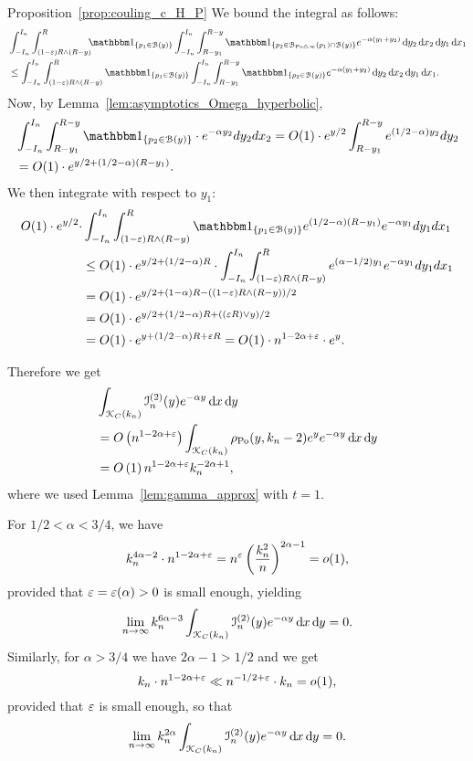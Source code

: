 \begin{proofof}{Proposition~\ref{prop:couling_c_H_P}}
We bound the integral as follows: 
\begin{align*}
	&\int_{-I_n}^{I_n} \int_{(1-\eps) R \wedge (R-y)}^{R} \hspace{-5pt} \ind{p_1 \in \BallHyp{y}}
		\int_{-I_n}^{I_n} \int_{R - y_1}^{R - y} \ind{p_2 \in \BallSym{p_1} \cap \BallHyp{y}}
		e^{-\alpha(y_1 + y_2)} \dd y_2 \dd x_2 \dd y_1 \dd x_1 \\
	&\leq \int_{-I_n}^{I_n} \int_{(1-\eps) R \wedge (R-y)}^{R} \ind{p_1 \in \BallHyp{y}}
		\int_{-I_n}^{I_n} \int_{R - y_1}^{R - y} 
		\ind{p_2 \in  \BallHyp{y}} e^{-\alpha(y_1 + y_2)} \dd y_2 \dd x_2 \dd y_1 \dd x_1.
\end{align*}
Now, by Lemma~\ref{lem:asymptotics_Omega_hyperbolic},
\begin{align*}
&\int_{-I_n}^{I_n} \int_{R - y_1}^{R - y} \ind{p_2 \in  \BallHyp{y}} \cdot  
e^{-\alpha y_2} dy_2 dx_2 = O(1) \cdot e^{y/2} \int_{R - y_1}^{R - y} e^{(1/2 - \alpha) y_2} dy_2 \\
&= O(1) \cdot e^{y/2 + (1/2 - \alpha) (R - y_1)}.
\end{align*}
We then integrate with respect to $y_1$:
\begin{align*}
	O(1) \cdot e^{y/2} \cdot 
	&\int_{-I_n}^{I_n} \int_{(1-\eps) R \wedge (R-y)}^{R} \ind{p_1 \in \BallHyp{y}} 
		e^{(1/2 - \alpha) (R - y_1)} e^{-\alpha y_1} dy_1 dx_1 \\
	&\le O(1) \cdot e^{y/2 + (1/2 -\alpha) R} \cdot \int_{-I_n}^{I_n} \int_{(1-\eps) R \wedge (R-y)}^{R} 
		e^{(\alpha -1/2) y_1} e^{-\alpha y_1} dy_1dx_1 \\
	&=O(1) \cdot e^{y/2 + (1 -\alpha) R -((1-\eps) R \wedge (R-y))/2} \\
	&=O(1) \cdot e^{y/2 + (1/2 -\alpha) R + ((\eps R) \vee y)/2}\\
	&=O(1) \cdot e^{y + (1/2 -\alpha) R + \eps R}
		= O(1) \cdot n^{1- 2\alpha+ \eps} \cdot e^{y}. 
\end{align*}

Therefore we get
\begin{align*} 
	&\int_{{\mathcal K}_{C}(k_n)}\mathcal{I}_n^{(2)}(y) e^{-\alpha y} \operatorname{\mathrm{d}\hspace{-2pt}} x \operatorname{\mathrm{d}\hspace{-2pt}} y\\
	&= O\left( n^{1-2\alpha + \varepsilon} \right)
		\int_{{\mathcal K}_{C}(k_n)} \rho_{{\mathrm{Po}}}(y,k_n-2) e^{y} e^{-\alpha y} \operatorname{\mathrm{d}\hspace{-2pt}} x \operatorname{\mathrm{d}\hspace{-2pt}} y\\
	&= O\left(1\right) n^{1-2\alpha + \varepsilon} k_n^{-2\alpha + 1},
\end{align*}
where we used Lemma~\ref{lem:gamma_approx} with $t = 1$.

For $1/2 < \alpha < 3/4$, we have
\[
	k_n^{4 \alpha -2} \cdot  n^{1-2\alpha + \varepsilon} = n^{\varepsilon} \left( \frac{k_n^2}{n}\right)^{2\alpha -1} = o(1),
\]
provided that $\varepsilon = \varepsilon (\alpha)>0$ is small enough, yielding
\[
	\lim_{n \to \infty} k_n^{6\alpha - 3} 
			\int_{{\mathcal K}_{C}(k_n)}\mathcal{I}_n^{(2)}(y) e^{-\alpha y} \operatorname{\mathrm{d}\hspace{-2pt}} x \operatorname{\mathrm{d}\hspace{-2pt}} y = 0.
\]
Similarly, for $\alpha > 3/4$ we have $2\alpha -1 > 1/2$ and we get
\[
	k_n \cdot n^{1-2\alpha + \varepsilon} \ll n^{-1/2 + \varepsilon}  \cdot k_n  = o(1),
\]
provided that $\varepsilon$ is small enough, so that
\[
	\lim_{n \to \infty} k_n^{2\alpha}
			\int_{{\mathcal K}_{C}(k_n)} \mathcal{I}_n^{(2)}(y) e^{-\alpha y} \operatorname{\mathrm{d}\hspace{-2pt}} x \operatorname{\mathrm{d}\hspace{-2pt}} y = 0.
\]


\end{proofof}
